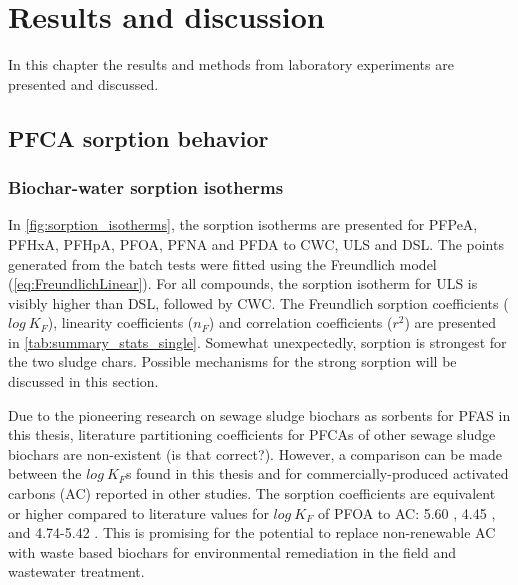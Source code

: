 \chapter{Results and discussion}\label{chap:Results&Disc}
In this chapter the results and methods from laboratory experiments are presented and discussed.

\section{PFCA sorption behavior}
\subsection{Biochar-water sorption isotherms}
In \cref{fig:sorption_isotherms}, the sorption isotherms are presented for PFPeA, PFHxA, PFHpA, PFOA, PFNA and PFDA to CWC, ULS and DSL. The points generated from the batch tests were fitted using the Freundlich model (\cref{eq:FreundlichLinear}). For all compounds, the sorption isotherm for ULS is visibly higher than DSL, followed by CWC. The Freundlich sorption coefficients ($log~K_F$), linearity coefficients ($n_F$) and correlation coefficients ($r^2$) are presented in \cref{tab:summary_stats_single}. Somewhat unexpectedly, sorption is strongest for the two sludge chars. Possible mechanisms for the strong sorption will be discussed in this section. 

Due to the pioneering research on sewage sludge biochars as sorbents for PFAS in this thesis, literature partitioning coefficients for PFCAs of other sewage sludge biochars are non-existent (is that correct?). However, a comparison can be made between the $log~K_F$s found in this thesis and for commercially-produced activated carbons (AC) reported in other studies. The sorption coefficients are equivalent or higher compared to literature values for $log~K_F$ of PFOA to AC: 5.60 \citep{Kupryianchyk2016a}, 4.45 \citep{hansen2010sorption}, and 4.74-5.42 \citep{silvani2019can}. This is promising for the potential to replace non-renewable AC with waste based biochars for environmental remediation in the field and wastewater treatment. 

